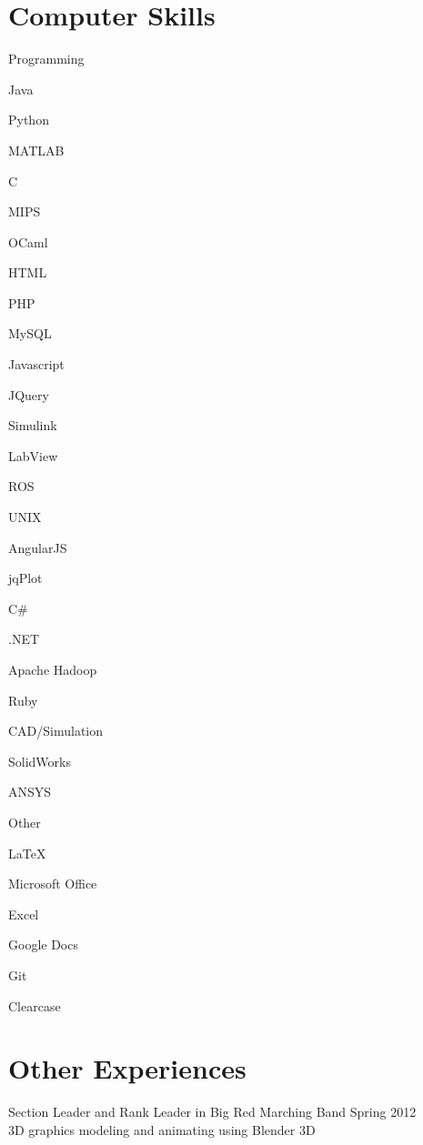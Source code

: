 \documentclass{BradyResume}
\begin{document}
\section*{Computer Skills}
\firstlineskip
\begin{delimlist}{Programming}
    \item Java
    \item Python
    \item MATLAB
    \item C
    \item MIPS
    \item OCaml
    \item HTML
    \item PHP
    \item MySQL
    \item Javascript
    \item JQuery
    \item Simulink 
    \item LabView
    \item ROS
    \item UNIX
    \item AngularJS
    \item jqPlot
    \item C\#
    \item .NET
    \item Apache Hadoop
    \item Ruby
\end{delimlist}

\begin{delimlist}{CAD/Simulation}
    \item SolidWorks
    \item ANSYS
\end{delimlist}

\begin{delimlist}{Other}
    \item \LaTeX\ 
    \item Microsoft Office%
    \item Excel
    \item Google Docs
    \item Git
    \item Clearcase
\end{delimlist}

\section*{Other Experiences}
Section Leader and Rank Leader in Big Red Marching Band \dotfill Spring 2012\\
3D graphics modeling and animating using Blender 3D
\end{document}
